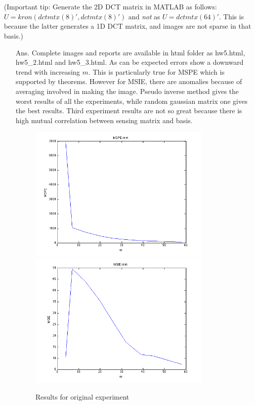 \documentclass[11pt]{article}
\begin{document}
\begin{enumerate}
\\
\\
(Important tip: Generate the 2D DCT matrix in MATLAB as follows: $U = kron(dctmtx(8)',dctmtx(8)')$ and \emph{not} as $U = dctmtx(64)'$. This is because the latter generates a 1D DCT matrix, and images are not sparse in that basis.)
\begin{itemize}
\item[Ans.] Complete images and reports are available in html folder as hw5.html, hw5\_2.html and hw5\_3.html. As can be expected errors show a downward trend with increasing $m$. This is particularly true for MSPE which is supported by theorems. However for MSIE, there are anomalies because of averaging involved in making the image. Pseudo inverse method gives the worst results of all the experiments, while random gaussian matrix one gives the best results. Third experiment results are not so great because there is high mutual correlation between sensing matrix and basis.
\begin{figure}[h]
			\centering
			\includegraphics[width=3.5in]{hw5_11.png}
			\includegraphics[width=3.5in]{hw5_12.png}
			\caption{Results for original experiment}
		\end{figure}
		

\end{itemize}
\end{enumerate}
\end{document}
